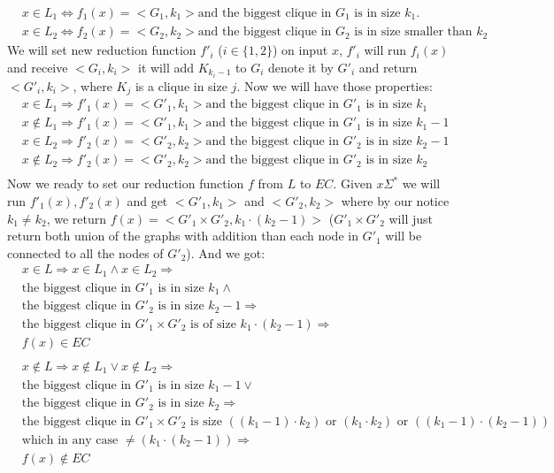 \documentclass[11pt]{article}
\theoremstyle{plain}
\theoremstyle{nonumberplainnobrackets}
\begin{document}
\begin{align*}
&x\in L_1 \iff f_1(x)=<G_1,k_1> \text{and the biggest clique in }G_1\text{ is in size }k_1. \\
&x \in L_2 \iff f_2(x)=<G_2,k_2> \text{and the biggest clique in } G_2 \text{ is in size smaller than } k_2
\end{align*}
We will set new reduction function $f'_i$ ($i\in \{1,2 \}$) on input $x$, $f'_i$ will run $f_i(x)$ and receive $<G_i,k_i>$ it will add $K_{{k_i}-1}$ to $G_i$ denote it by $G'_i$ and return $<G'_i,k_i>$, where $K_j$ is a clique in size $j$. Now we will have those properties: 
\begin{align*}
&x\in L_1 \Rightarrow  f'_1(x)=<G'_1,k_1> \text{and the biggest clique in }G'_1\text{ is in size }k_1\\
&x\notin L_1 \Rightarrow  f'_1(x)=<G'_1,k_1> \text{and the biggest clique in }G'_1\text{ is in size }k_1-1 \\
&x \in L_2 \Rightarrow  f'_2(x)=<G'_2,k_2> \text{and the biggest clique in }G'_2\text{ is in size }k_2-1 \\
&x\notin L_2 \Rightarrow   f'_2(x)=<G'_2,k_2> \text{and the biggest clique in }G'_2\text{ is in size }k_2  \\
\end{align*}
Now we ready to set our reduction function $f$ from $L$ to $EC$. Given $x\Sigma^*$ we will run $f'_1(x),f'_2(x)$ and get $<G'_1,k_1>$ and $<G'_2,k_2>$ where by our notice $k_1\ne k_2$, we return $f(x) =<G'_1\times G'_2,k_1\cdot (k_2-1)>$ ($G'_1\times G'_2$ will just return both union of the graphs with addition than each node in $G'_1$ will be connected to all the  nodes of $G'_2$). And we got:
\begin{align*}
&x\in L \Rightarrow x\in L_1 \wedge x \in L_2 \Rightarrow \\
& \text{the biggest clique in }G'_1\text{ is in size }k_1 \wedge \\
&\text{the biggest clique in }G'_2\text{ is in size }k_2-1 \Rightarrow\\
& \text{the biggest clique in  } G'_1\times G'_2  \text{ is of size } k_1\cdot (k_2-1) \Rightarrow\\
& f(x)\in EC\\
\\
&x\notin L \Rightarrow x\notin L_1 \vee x \notin L_2 \Rightarrow \\
& \text{the biggest clique in }G'_1\text{ is in size }k_1-1 \vee \\
&\text{the biggest clique in }G'_2\text{ is in size }k_2 \Rightarrow\\
& \text{the biggest clique in  } G'_1\times G'_2  \text{ is size } ((k_1-1)\cdot k_2) \text{ or } (k_1\cdot k_2) \text{ or } ((k_1-1)\cdot (k_2-1)) \\
&\text{which in any case } \ne (k_1\cdot (k_2-1)) \Rightarrow\\
& f(x)\notin EC
\end{align*}
\newpage
\end{document}
